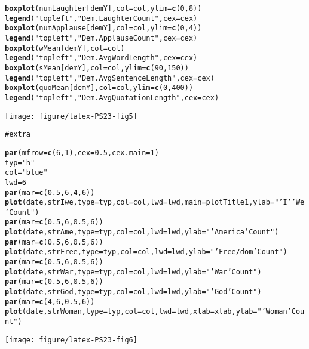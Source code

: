 \documentclass{article}\usepackage{graphicx, color}
\makeatletter
\newcommand{\hlfunctioncall}[1]{\textcolor[rgb]{0.501960784313725,0,0.329411764705882}{\textbf{#1}}}%
\newcommand{\hlstring}[1]{\textcolor[rgb]{0.6,0.6,1}{#1}}%
\newcommand{\hlcomment}[1]{\textcolor[rgb]{0.180392156862745,0.6,0.341176470588235}{#1}}%
\newenvironment{kframe}{%
 \def\at@end@of@kframe{}%
 \ifinner\ifhmode%
  \def\at@end@of@kframe{\end{minipage}}%
  \begin{minipage}{\columnwidth}%
 \fi\fi%
 \def\FrameCommand##1{\hskip\@totalleftmargin \hskip-\fboxsep
 \colorbox{shadecolor}{##1}\hskip-\fboxsep
     \hskip-\linewidth \hskip-\@totalleftmargin \hskip\columnwidth}%
 \MakeFramed {\advance\hsize-\width
   \@totalleftmargin\z@ \linewidth\hsize
   \@setminipage}}%
 {\par\unskip\endMakeFramed%
 \at@end@of@kframe}
\newenvironment{knitrout}{}{} %
\makeatother
\begin{document}
\begin{knitrout}
\begin{kframe}
\begin{alltt}
\hlfunctioncall{boxplot}(numLaughter[demY], col = col, ylim = \hlfunctioncall{c}(0, 8))
\hlfunctioncall{legend}(\hlstring{"topleft"}, \hlstring{"Dem. Laughter Count"}, cex = cex)
\hlfunctioncall{boxplot}(numApplause[demY], col = col, ylim = \hlfunctioncall{c}(0, 4))
\hlfunctioncall{legend}(\hlstring{"topleft"}, \hlstring{"Dem. Applause Count"}, cex = cex)
\hlfunctioncall{boxplot}(wMean[demY], col = col)
\hlfunctioncall{legend}(\hlstring{"topleft"}, \hlstring{"Dem. Avg Word Length"}, cex = cex)
\hlfunctioncall{boxplot}(sMean[demY], col = col, ylim = \hlfunctioncall{c}(90, 150))
\hlfunctioncall{legend}(\hlstring{"topleft"}, \hlstring{"Dem. Avg Sentence Length"}, cex = cex)
\hlfunctioncall{boxplot}(quoMean[demY], col = col, ylim = \hlfunctioncall{c}(0, 400))
\hlfunctioncall{legend}(\hlstring{"topleft"}, \hlstring{"Dem. Avg Quotation Length"}, cex = cex)
\end{alltt}
\end{kframe}\texttt{[image: figure/latex-PS23-fig5]} \begin{kframe}\begin{alltt}
\hlcomment{# extra}

\hlfunctioncall{par}(mfrow = \hlfunctioncall{c}(6, 1), cex = 0.5, cex.main = 1)
typ = \hlstring{"h"}
col = \hlstring{"blue"}
lwd = 6
\hlfunctioncall{par}(mar = \hlfunctioncall{c}(0.5, 6, 4, 6))
\hlfunctioncall{plot}(date, strIwe, type = typ, col = col, lwd = lwd, main = plotTitle1, ylab = \hlstring{"\hlstring{'I'}\hlstring{'We'} Count"})
\hlfunctioncall{par}(mar = \hlfunctioncall{c}(0.5, 6, 0.5, 6))
\hlfunctioncall{plot}(date, strAme, type = typ, col = col, lwd = lwd, ylab = \hlstring{"\hlstring{'America'} Count"})
\hlfunctioncall{par}(mar = \hlfunctioncall{c}(0.5, 6, 0.5, 6))
\hlfunctioncall{plot}(date, strFree, type = typ, col = col, lwd = lwd, ylab = \hlstring{"\hlstring{'Free/dom'} Count"})
\hlfunctioncall{par}(mar = \hlfunctioncall{c}(0.5, 6, 0.5, 6))
\hlfunctioncall{plot}(date, strWar, type = typ, col = col, lwd = lwd, ylab = \hlstring{"\hlstring{'War'} Count"})
\hlfunctioncall{par}(mar = \hlfunctioncall{c}(0.5, 6, 0.5, 6))
\hlfunctioncall{plot}(date, strGod, type = typ, col = col, lwd = lwd, ylab = \hlstring{"\hlstring{'God'} Count"})
\hlfunctioncall{par}(mar = \hlfunctioncall{c}(4, 6, 0.5, 6))
\hlfunctioncall{plot}(date, strWoman, type = typ, col = col, lwd = lwd, xlab = xlab, ylab = \hlstring{"\hlstring{'Woman'} Count"})
\end{alltt}
\end{kframe}\texttt{[image: figure/latex-PS23-fig6]} \begin{kframe}\begin{alltt}


\end{alltt}
\end{kframe}
\end{knitrout}
\end{document}
